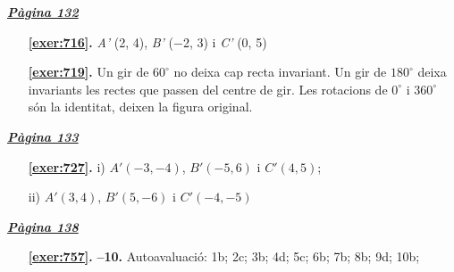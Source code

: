 
\hyperlink{page.132}{\textbf{\em Pàgina 132}}
\begin{enumerate}
\item[\fontfamily{phv}\selectfont\color{blue}\textbf{\ref{exer:716}. }] \label{ans:716} 
\textit {A'} (2, 4), \textit {B'} ($-$2, 3) i \textit {C'} (0, 5)
 \end{enumerate}
\begin{enumerate}
\item[\fontfamily{phv}\selectfont\color{blue}\textbf{\ref{exer:719}. }] \label{ans:719} 
 Un gir de $60^\circ $ no deixa cap recta invariant. Un gir de $180^\circ $ deixa invariants les rectes que passen del centre de gir. Les rotacions de $0^\circ $ i $360^\circ $ són la identitat, deixen la figura original. 
 \end{enumerate}
\vspace{0.3cm}


\hyperlink{page.133}{\textbf{\em Pàgina 133}}
\begin{enumerate}
\item[\fontfamily{phv}\selectfont\color{blue}\textbf{\ref{exer:727}. }] \label{ans:727} 
i) $A'(-3,-4)$, $B'(-5,6)$ i $C'(4,5)$;\par ii) $A'(3,4)$, $B'(5,-6)$ i $C'(-4,-5)$
 \end{enumerate}
\vspace{0.3cm}


\hyperlink{page.138}{\textbf{\em Pàgina 138}}
\begin{enumerate}
\item[\fontfamily{phv}\selectfont\color{blue}\textbf{\ref{exer:757}. }] \label{ans:757} 
\textbf {--10. } Autoavaluació: 1b; 2c; 3b; 4d; 5c; 6b; 7b; 8b; 9d; 10b;
 \end{enumerate}

 \vspace{1cm} 
 

\vspace{0.3cm}


